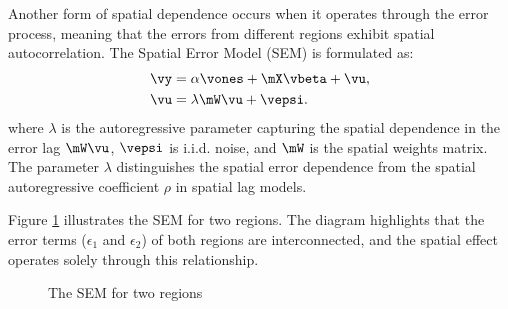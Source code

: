 \documentclass[english,12pt]{book}\usepackage[]{graphicx}\usepackage[]{xcolor}
\begin{document}
Another form of spatial dependence occurs when it operates through the error process, meaning that the errors from different regions exhibit spatial autocorrelation. The Spatial Error Model (SEM) is formulated as:
\begin{equation}\label{eq:sem_model_comp}
  \begin{aligned}
\vy &= \alpha \vones + \mX\vbeta + \vu, \\
\vu &= \lambda \mW\vu + \vepsi. \\
 \end{aligned}
\end{equation}
%
where $\lambda$ is the autoregressive parameter capturing the spatial dependence in the error lag $\mW\vu$, $\vepsi$ is i.i.d. noise, and $\mW$ is the spatial weights matrix. The parameter $\lambda$ distinguishes the spatial error dependence from the spatial autoregressive coefficient $\rho$ in spatial lag models.

Figure \ref{figure:sem} illustrates the SEM for two regions. The diagram highlights that the error terms ($\epsilon_1$ and $\epsilon_2$) of both regions are interconnected, and the spatial effect operates solely through this relationship.	

\begin{figure}[ht]
	\centering
	\caption{The SEM for two regions}\label{figure:sem}	
\end{figure}
\end{document}
